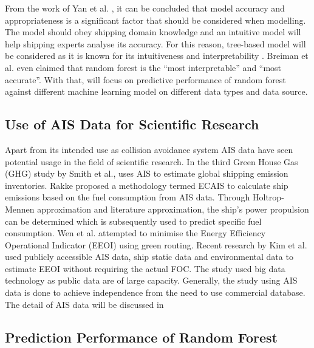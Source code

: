 From the work of Yan et al. \citep{Yan.2021}, it can be concluded that model accuracy and appropriateness is a significant factor that should be considered when modelling. The model should obey shipping domain knowledge and an intuitive model will help shipping experts analyse its accuracy. For this reason, tree-based model will be considered as it is known for its intuitiveness and interpretability \citep{Breiman.2017}. Breiman et al.\citep{Breiman.2001} even claimed that random forest is the ``most interpretable'' and ``most accurate''. With that, will focus on predictive performance of random forest against different machine learning model on different data types and data source. \\

\subsection{Use of AIS Data for Scientific Research}\label{sec:ais_use}

Apart from its intended use as collision avoidance system AIS data have seen potential usage in the field of scientific research. In the third Green House Gas (GHG) study by Smith et al.\citep{T.W.P.Smith.2015}, uses AIS to estimate global shipping emission inventories. Rakke \citep{Rakke2016} proposed a methodology termed ECAIS to calculate ship emissions based on the fuel consumption from AIS data. Through Holtrop-Mennen approximation and literature approximation, the ship's power propulsion can be determined which is subsequently used to predict specific fuel consumption. Wen et al. \citep{Wen.2017} attempted to minimise the Energy Efficiency Operational Indicator (EEOI) using green routing. Recent research by Kim et al. \citep{Kim.2020b} used publicly accessible AIS data, ship static data and environmental data to estimate EEOI  without requiring the actual FOC. The study used big data technology as public data are of large capacity. Generally, the study using AIS data is done to achieve independence from the need to use commercial database. The detail of AIS data will be discussed in \\  

\subsection{Prediction Performance of Random Forest}\label{sec:rf_performance}

